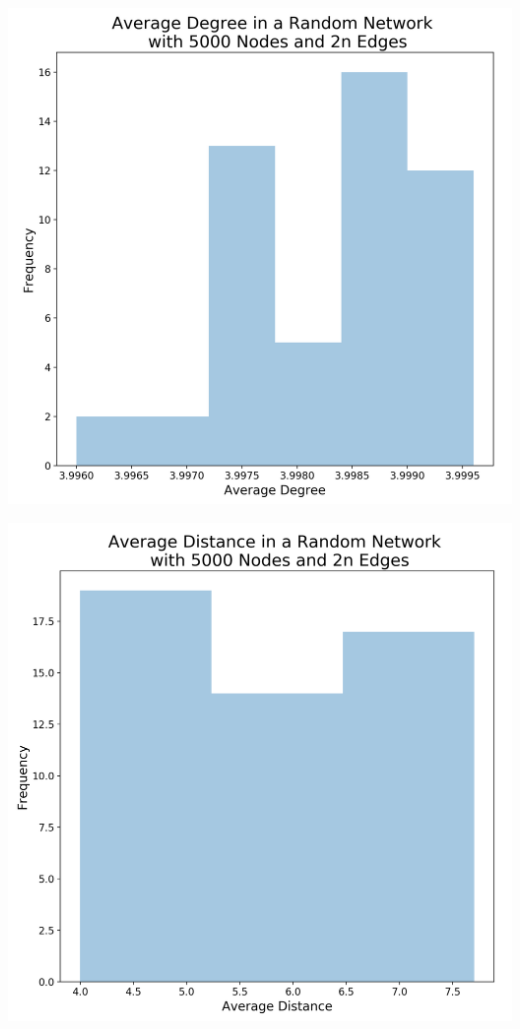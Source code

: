 \documentclass[journal]{IEEEtran}
\begin{document}
\begingroup
    \centering
    \medskip
    \includegraphics[width=\columnwidth]{images/r_deg_50.png}
    \label{fig:fifty_average_random_degree}
    \medskip
\endgroup

\bigskip
\bigskip
\bigskip

\begingroup
    \centering
    \medskip
    \includegraphics[width=\columnwidth]{images/r_dist_50.png}
    \label{fig:fifty_average_random_distance}
    \medskip
\endgroup
\end{document}
